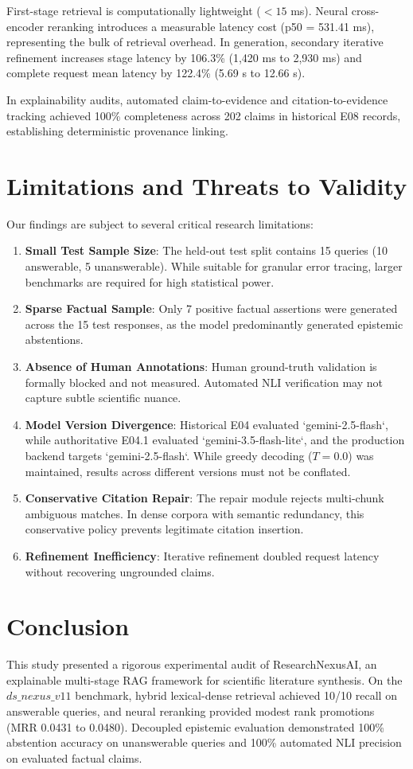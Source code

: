 \documentclass[conference]{IEEEtran}
\begin{document}
First-stage retrieval is computationally lightweight ($<15$ ms). Neural cross-encoder reranking introduces a measurable latency cost (p50 = 531.41 ms), representing the bulk of retrieval overhead. In generation, secondary iterative refinement increases stage latency by 106.3\% (1,420 ms to 2,930 ms) and complete request mean latency by 122.4\% (5.69 s to 12.66 s).

In explainability audits, automated claim-to-evidence and citation-to-evidence tracking achieved 100\% completeness across 202 claims in historical E08 records, establishing deterministic provenance linking.

\section{Limitations and Threats to Validity}
Our findings are subject to several critical research limitations:
\begin{enumerate}
    \item \textbf{Small Test Sample Size}: The held-out test split contains 15 queries (10 answerable, 5 unanswerable). While suitable for granular error tracing, larger benchmarks are required for high statistical power.
    \item \textbf{Sparse Factual Sample}: Only 7 positive factual assertions were generated across the 15 test responses, as the model predominantly generated epistemic abstentions.
    \item \textbf{Absence of Human Annotations}: Human ground-truth validation is formally blocked and not measured. Automated NLI verification may not capture subtle scientific nuance.
    \item \textbf{Model Version Divergence}: Historical E04 evaluated `gemini-2.5-flash`, while authoritative E04.1 evaluated `gemini-3.5-flash-lite`, and the production backend targets `gemini-2.5-flash`. While greedy decoding ($T=0.0$) was maintained, results across different versions must not be conflated.
    \item \textbf{Conservative Citation Repair}: The repair module rejects multi-chunk ambiguous matches. In dense corpora with semantic redundancy, this conservative policy prevents legitimate citation insertion.
    \item \textbf{Refinement Inefficiency}: Iterative refinement doubled request latency without recovering ungrounded claims.
\end{enumerate}

\section{Conclusion}
This study presented a rigorous experimental audit of ResearchNexusAI, an explainable multi-stage RAG framework for scientific literature synthesis. On the $ds\_nexus\_v11$ benchmark, hybrid lexical-dense retrieval achieved 10/10 recall on answerable queries, and neural reranking provided modest rank promotions (MRR 0.0431 to 0.0480). Decoupled epistemic evaluation demonstrated 100\% abstention accuracy on unanswerable queries and 100\% automated NLI precision on evaluated factual claims. 
\end{document}
